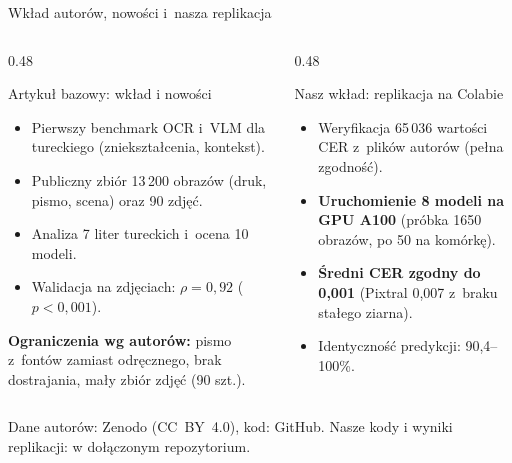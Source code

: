 \documentclass[aspectratio=169,11pt]{beamer}
\newcommand{\zrodlo}[1]{\par\vfill{\tiny\color{black!65}#1\par}}
\begin{document}
\begin{frame}{Wkład autorów, nowości i~nasza replikacja}
  \begin{columns}[T]
    \begin{column}{0.48\textwidth}
      \begin{block}{Artykuł bazowy: wkład i nowości}
        \small
        \setlength{\leftmargini}{1.2em}
        \begin{itemize}
          \setlength{\itemsep}{0pt}
          \item Pierwszy benchmark OCR i~VLM dla tureckiego (zniekształcenia, kontekst).
          \item Publiczny zbiór 13\,200 obrazów (druk, pismo, scena) oraz 90 zdjęć.
          \item Analiza 7 liter tureckich i~ocena 10 modeli.
          \item Walidacja na zdjęciach: $\rho=0{,}92$ ($p<0{,}001$).
        \end{itemize}
      \end{block}
      \vspace{2pt}
      {\scriptsize \textbf{Ograniczenia wg autorów:} pismo z~fontów zamiast odręcznego, brak dostrajania, mały zbiór zdjęć (90 szt.).\par}
    \end{column}
    \begin{column}{0.48\textwidth}
      \begin{block}{Nasz wkład: replikacja na Colabie}
        \small
        \setlength{\leftmargini}{1.2em}
        \begin{itemize}
          \setlength{\itemsep}{0pt}
          \item Weryfikacja 65\,036 wartości CER z~plików autorów (pełna zgodność).
          \item \textbf{Uruchomienie 8 modeli na GPU A100} (próbka 1650 obrazów, po 50 na komórkę).
          \item \textbf{Średni CER zgodny do 0,001} (Pixtral 0,007 z~braku stałego ziarna).
          \item Identyczność predykcji: 90,4--100\%.
        \end{itemize}
      \end{block}
    \end{column}
  \end{columns}
  \zrodlo{Dane autorów: Zenodo (CC~BY~4.0), kod: GitHub. Nasze kody i wyniki replikacji: w dołączonym repozytorium.}
\end{frame}
\end{document}
